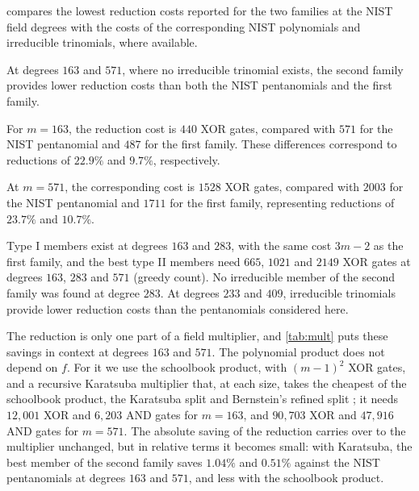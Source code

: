 \documentclass{ieeeaccess}
\theoremstyle{plain}
\theoremstyle{definition}
\begin{document}
 compares the lowest reduction costs reported for the two
families at the NIST field degrees with the costs of the corresponding NIST
polynomials and irreducible trinomials, where available.

At degrees $163$ and $571$, where no irreducible trinomial exists, the second
family provides lower reduction costs than both the NIST pentanomials and the
first family.

For $m=163$, the reduction cost is $440$ XOR gates, compared with $571$ for the
NIST pentanomial and $487$ for the first family. These differences correspond to
reductions of $22.9\%$ and $9.7\%$, respectively.

At $m=571$, the corresponding cost is $1528$ XOR gates, compared with $2003$ for
the NIST pentanomial and $1711$ for the first family, representing reductions of
$23.7\%$ and $10.7\%$.

Type I members exist at degrees $163$ and $283$, with the same cost $3m-2$ as
the first family, and the best type II members need $665$, $1021$ and $2149$ XOR
gates at degrees $163$, $283$ and $571$ (greedy count).
No irreducible member of the second family was found at degree $283$. At degrees
$233$ and $409$, irreducible trinomials provide lower reduction costs than the
pentanomials considered here.

The reduction is only one part of a field multiplier, and \cref{tab:mult} puts
these savings in context at degrees $163$ and $571$. The polynomial product does
not depend on $f$. For it we use the schoolbook product, with $(m-1)^2$ XOR
gates, and a recursive Karatsuba multiplier \cite{KaratsubaOfman1963} that, at
each size, takes the cheapest of the schoolbook product, the Karatsuba split and
Bernstein's refined split \cite{Bernstein2009}; it needs $12,001$ XOR and
$6,203$ AND gates for $m=163$, and $90,703$ XOR and $47,916$ AND gates for
$m=571$. The absolute saving of the reduction carries over to the multiplier
unchanged, but in relative terms it becomes small: with Karatsuba, the best
member of the second family saves $1.04\%$ and $0.51\%$ against the NIST
pentanomials at degrees $163$ and $571$, and less with the schoolbook product.
\end{document}
